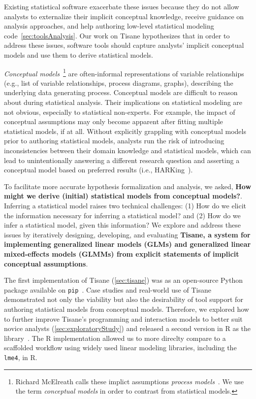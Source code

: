 Existing statistical software exacerbate these issues because they do not allow
analysts to externalize their implicit conceptual knowledge, receive guidance on
analysis approaches, and help authoring low-level statistical modeling
code~\autoref{sec:toolsAnalysis}. Our work on Tisane hypothesizes that in order
to address these issues, software tools should capture analysts' implicit
conceptual models and use them to derive statistical models. 

\textit{Conceptual models}~\footnote{Richard McElreath calls these implict
assumptions \textit{process models}~\cite{mcelreath2020statistical}. We use the
term \textit{conceptual models} in order to contrast from statistical models.}
are often-informal representations of variable relationships (e.g., list of
variable relationships, process diagrams, graphs), describing the underlying
data generating process. Conceptual models are difficult to reason about during
statistical analysis. Their implications on statistical modeling are not
obvious, especially to statistical non-experts. For example, the impact of
conceptual assumptions may only become apparent after fitting multiple
statistical models, if at all. Without explicitly grappling with conceptual
models prior to authoring statistical models, analysts run the risk of
introducing inconsistencies between their domain knowledge and statistical
models, which can lead to unintentionally answering a different research
question and asserting a conceptual model based on preferred results (i.e.,
HARKing~\cite{}). 

To facilitate more accurate hypothesis formalization and analysis, we asked,
\textbf{How might we derive (initial) statistical models from conceptual
models?}. Inferring a statistical model raises two technical challenges: (1) How
do we elicit the information necessary for inferring a statistical model? and
(2) How do we infer a statistical model, given this information? We explore and
address these issues by iteratively designing, developing, and evaluating
\textbf{Tisane, a system for implementing generalized linear models (GLMs) and
generalized linear mixed-effects models (GLMMs) from explicit statements of
implicit conceptual assumptions}. 

The first implementation of Tisane (\autoref{sec:tisane}) was as an open-source
Python package available on \texttt{pip}~\cite{tisaneOnPip}. Case studies and
real-world use of Tisane~\cite{} demonstrated not only the viability but also
the desirability of tool support for authoring statistical models from
conceptual models. Therefore, we explored how to further improve Tisane's
programming and interaction models to better suit novice analysts
(\autoref{sec:exploratoryStudy}) and released a second version in R as the
\rTisane library~\cite{rTisane link}. The R implementation allowed us to more
direclty compare \rTisane to a scaffolded workflow using widely used linear
modeling libraries, including the \texttt{lme4}, in R. 

